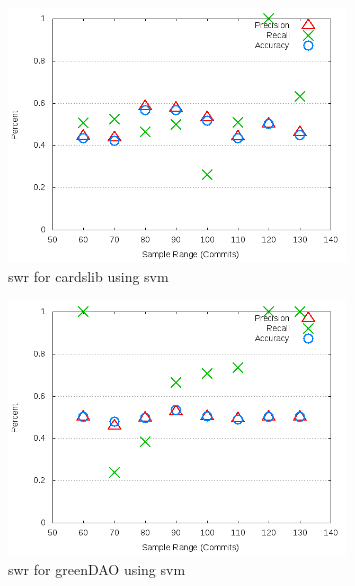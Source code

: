 \clearpage

\begin{figure}[!t]
\centering
\includegraphics[width=0.8\textwidth]{images/svm/test_1/cardslib_sample_range.png}
\caption{\gls{swr} for cardslib using \gls{svm}}
\label{fig:test_1_cardslib_svm}
\end{figure}

\begin{figure}[!t]
\centering
\includegraphics[width=0.8\textwidth]{images/svm/test_1/greenDAO_sample_range.png}
\caption{\gls{swr} for greenDAO using \gls{svm}}
\label{fig:test_1_greenDAO_svm}
\end{figure}

